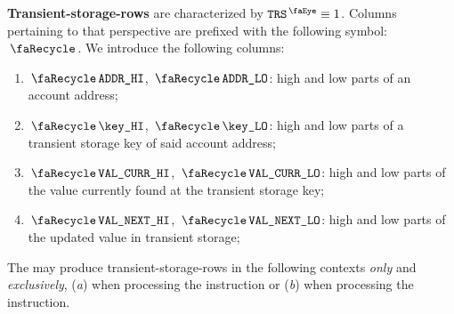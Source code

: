 \textbf{Transient-storage-rows} are characterized by $\peekTransient \equiv 1$.
Columns pertaining to that perspective are prefixed with the following symbol: $\transientSignifier$.
We introduce the following columns:
\begin{enumerate}
	\item
		$\transAddressHi$,
		$\transAddressLo$:
		high and low parts of an account address;
	\item
		$\transKeyHi$,
		$\transKeyLo$:
		high and low parts of a transient storage key of said account address;
	\item
		$\transCurrValueHi$,
		$\transCurrValueLo$:
		high and low parts of the value currently found at the transient storage key;
	\item
		$\transNextValueHi$,
		$\transNextValueLo$:
		high and low parts of the updated value in transient storage;
\end{enumerate}
\saNote{}
The \zkEvm{} may produce transient-storage-rows in the following contexts \emph{only} and \emph{exclusively},
(\emph{a}) when processing the  instruction or
(\emph{b}) when processing the  instruction.
